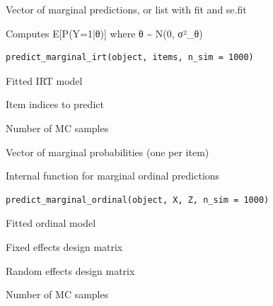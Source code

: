 \documentclass[a4paper]{book}
\begin{document}
%
\begin{Value}
Vector of marginal predictions, or list with fit and se.fit
\end{Value}
%
\begin{Description}
Computes E[P(Y=1|θ)] where θ \textasciitilde{} N(0, σ²\_θ)
\end{Description}
%
\begin{Usage}
\begin{verbatim}
predict_marginal_irt(object, items, n_sim = 1000)
\end{verbatim}
\end{Usage}
%
\begin{Arguments}
\begin{ldescription}
\item[\code{object}] Fitted IRT model

\item[\code{items}] Item indices to predict

\item[\code{n\_sim}] Number of MC samples
\end{ldescription}
\end{Arguments}
%
\begin{Value}
Vector of marginal probabilities (one per item)
\end{Value}
%
\begin{Description}
Internal function for marginal ordinal predictions
\end{Description}
%
\begin{Usage}
\begin{verbatim}
predict_marginal_ordinal(object, X, Z, n_sim = 1000)
\end{verbatim}
\end{Usage}
%
\begin{Arguments}
\begin{ldescription}
\item[\code{object}] Fitted ordinal model

\item[\code{X}] Fixed effects design matrix

\item[\code{Z}] Random effects design matrix

\item[\code{n\_sim}] Number of MC samples
\end{ldescription}
\end{Arguments}
\end{document}
